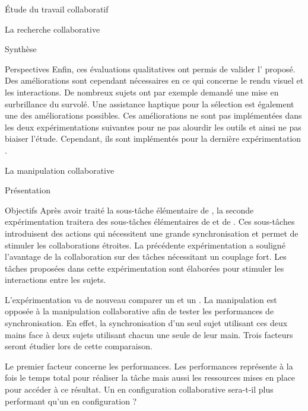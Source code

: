 \documentclass[myfrancais]{mythesis}
\begin{document}
\begin{mypart}{Étude du travail collaboratif}
\begin{mychapter}{La recherche collaborative}
\begin{mysection}{Synthèse}
\begin{mysubsection}{Perspectives}
					Enfin, ces évaluations qualitatives ont permis de valider l' proposé.
					Des améliorations sont cependant nécessaires en ce qui concerne le rendu visuel et les interactions.
					De nombreux sujets ont par exemple demandé une mise en surbrillance du  survolé.
					Une assistance haptique pour la sélection est également une des améliorations possibles.
					Ces améliorations ne sont pas implémentées dans les deux expérimentations suivantes pour ne pas alourdir les outils et ainsi ne pas biaiser l'étude.
					Cependant, ils sont implémentés pour la dernière expérimentation .
				\end{mysubsection}
			\end{mysection}
		\end{mychapter}
		\begin{mychapter}{La manipulation collaborative}
			\begin{mysection}{Présentation}
				\begin{mysubsection}{Objectifs}
					Après avoir traité la sous-tâche élémentaire de , la seconde expérimentation traitera des sous-tâches élémentaires de  et de  .
					Ces sous-tâches introduisent des actions qui nécessitent une grande synchronisation et permet de stimuler les collaborations étroites.
					La précédente expérimentation  a souligné l'avantage de la collaboration sur des tâches nécessitant un couplage fort.
					Les tâches proposées dans cette expérimentation sont élaborées pour stimuler les interactions entre les sujets.

					L'expérimentation va de nouveau comparer un  et un .
					La manipulation  est opposée à la manipulation collaborative afin de tester les performances de synchronisation.
					En effet, la synchronisation d'un seul sujet utilisant ces deux mains face à deux sujets utilisant chacun une seule de leur main.
					Trois facteurs seront étudier lors de cette comparaison.

					Le premier facteur concerne les performances.
					Les performances représente à la fois le temps total pour réaliser la tâche mais aussi les ressources mises en place pour accéder à ce résultat.
					Un  en configuration collaborative sera-t-il plus performant qu'un  en configuration  ?


\end{mysubsection}
\end{mysection}
\end{mychapter}
\end{mypart}
\end{document}
